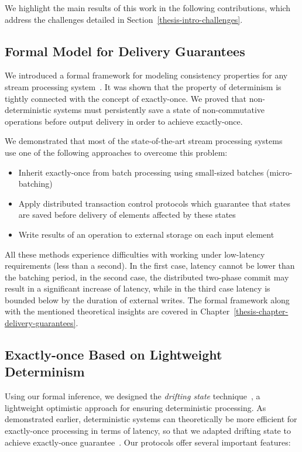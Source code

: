 We highlight the main results of this work in the following contributions, which address the challenges detailed in Section~\ref{thesis-intro-challenges}.

\subsection{Formal Model for Delivery Guarantees}

We introduced a formal framework for modeling consistency properties for any stream processing system~\cite{thepaper}. It was shown that the property of determinism is tightly connected with the concept of exactly-once. We proved that non-deterministic systems must persistently save a state of non-commutative operations before output delivery in order to achieve exactly-once.

We demonstrated that most of the state-of-the-art stream processing systems~\cite{Carbone:2017:SMA:3137765.3137777, Zaharia:2012:DSE:2342763.2342773, Akidau:2013:MFS:2536222.2536229, apache:storm:trident} use one of the following approaches to overcome this problem: 

\begin{itemize}
    \item Inherit exactly-once from batch processing using small-sized batches (micro-batching)
    \item Apply distributed transaction control protocols which guarantee that states are saved before delivery of elements affected by these states
    \item Write results of an operation to external storage on each input element
\end{itemize}

All these methods experience difficulties with working under low-latency requirements (less than a second). In the first case, latency cannot be lower than the batching period, in the second case, the distributed two-phase commit may result in a significant increase of latency, while in the third case latency is bounded below by the duration of external writes. The formal framework along with the mentioned theoretical insights are covered in Chapter~\ref{thesis-chapter-delivery-guarantees}.

\subsection{Exactly-once Based on Lightweight Determinism}

Using our formal inference, we designed the \textit{drifting state} technique~\cite{we2018adbis}, a lightweight optimistic approach for ensuring deterministic processing. As demonstrated earlier, deterministic systems can theoretically be more efficient for exactly-once processing in terms of latency, so that we adapted drifting state to achieve exactly-once guarantee~\cite{thepaper}. Our protocols offer several important features:

